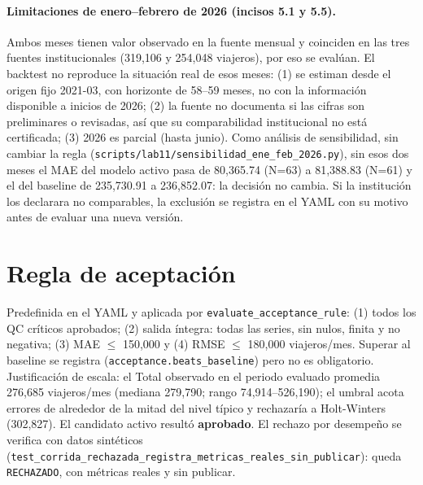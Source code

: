 \documentclass[11pt,a4paper]{article}
\newcommand{\cod}[1]{\texttt{\small #1}}
\begin{document}
\paragraph{Limitaciones de enero--febrero de 2026 (incisos 5.1 y 5.5).} Ambos meses tienen valor observado en la fuente mensual y coinciden en las tres fuentes institucionales (319{,}106 y 254{,}048 viajeros), por eso se evalúan. El backtest no reproduce la situación real de esos meses: (1) se estiman desde el origen fijo 2021-03, con horizonte de 58--59 meses, no con la información disponible a inicios de 2026; (2) la fuente no documenta si las cifras son preliminares o revisadas, así que su comparabilidad institucional no está certificada; (3) 2026 es parcial (hasta junio). Como análisis de sensibilidad, sin cambiar la regla (\cod{scripts/lab11/sensibilidad\_ene\_feb\_2026.py}), sin esos dos meses el MAE del modelo activo pasa de 80{,}365.74 (N=63) a 81{,}388.83 (N=61) y el del baseline de 235{,}730.91 a 236{,}852.07: la decisión no cambia. Si la institución los declarara no comparables, la exclusión se registra en el YAML con su motivo antes de evaluar una nueva versión.

\section{Regla de aceptación}
Predefinida en el YAML y aplicada por \cod{evaluate\_acceptance\_rule}: (1) todos los QC críticos aprobados; (2) salida íntegra: todas las series, sin nulos, finita y no negativa; (3) MAE $\le$ 150{,}000 y (4) RMSE $\le$ 180{,}000 viajeros/mes. Superar al baseline se registra (\cod{acceptance.beats\_baseline}) pero no es obligatorio. Justificación de escala: el Total observado en el periodo evaluado promedia 276{,}685 viajeros/mes (mediana 279{,}790; rango 74{,}914--526{,}190); el umbral acota errores de alrededor de la mitad del nivel típico y rechazaría a Holt-Winters (302{,}827). El candidato activo resultó \textbf{aprobado}. El rechazo por desempeño se verifica con datos sintéticos (\cod{test\_corrida\_rechazada\_registra\_metricas\_reales\_sin\_publicar}): queda \cod{RECHAZADO}, con métricas reales y sin publicar.

\end{document}
